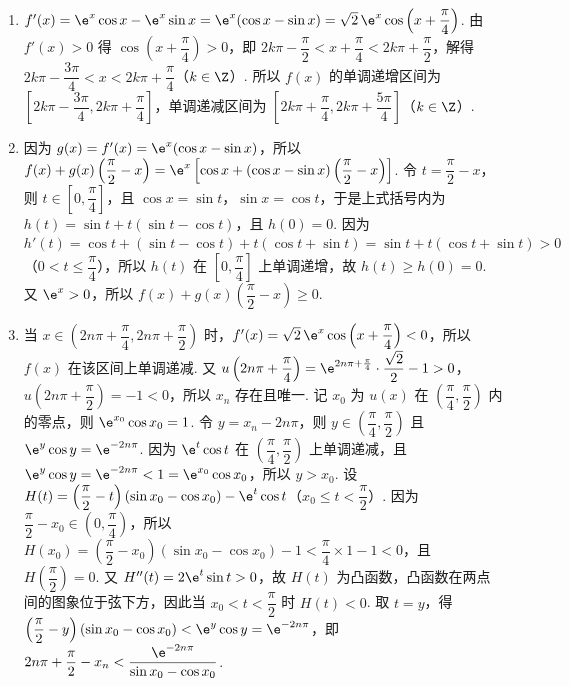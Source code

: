 \begin{solution}
\begin{enumerate}
\item \(f'(x)=\e^x\cos x-\e^x\sin x=\e^x(\cos x-\sin x)=\sqrt2\,\e^x\cos\left(x+\dfrac\pi4\right)\). 由 \(f'(x)>0\) 得 \(\cos\left(x+\dfrac\pi4\right)>0\)，即 \(2k\pi-\dfrac\pi2<x+\dfrac\pi4<2k\pi+\dfrac\pi2\)，解得 \(2k\pi-\dfrac{3\pi}{4}<x<2k\pi+\dfrac\pi4\)（\(k\in\Z\)）. 所以 \(f(x)\) 的单调递增区间为 \(\left[2k\pi-\dfrac{3\pi}{4},2k\pi+\dfrac\pi4\right]\)，单调递减区间为 \(\left[2k\pi+\dfrac\pi4,2k\pi+\dfrac{5\pi}{4}\right]\)（\(k\in\Z\)）.
\item 因为 \(g(x)=f'(x)=\e^x(\cos x-\sin x)\)，所以 \(f(x)+g(x)\left(\dfrac\pi2-x\right)=\e^x\left[\cos x+(\cos x-\sin x)\left(\dfrac\pi2-x\right)\right]\). 令 \(t=\dfrac\pi2-x\)，则 \(t\in\left[0,\dfrac\pi4\right]\)，且 \(\cos x=\sin t\)，\(\sin x=\cos t\)，于是上式括号内为 \(h(t)=\sin t+t(\sin t-\cos t)\)，且 \(h(0)=0\). 因为 \(h'(t)=\cos t+(\sin t-\cos t)+t(\cos t+\sin t)=\sin t+t(\cos t+\sin t)>0\)（\(0<t\le\dfrac\pi4\)），所以 \(h(t)\) 在 \(\left[0,\dfrac\pi4\right]\) 上单调递增，故 \(h(t)\ge h(0)=0\). 又 \(\e^x>0\)，所以 \(f(x)+g(x)\left(\dfrac\pi2-x\right)\ge0\).
\item 当 \(x\in\left(2n\pi+\dfrac\pi4,2n\pi+\dfrac\pi2\right)\) 时，\(f'(x)=\sqrt2\,\e^x\cos\left(x+\dfrac\pi4\right)<0\)，所以 \(f(x)\) 在该区间上单调递减. 又 \(u\left(2n\pi+\dfrac\pi4\right)=\e^{2n\pi+\frac\pi4}\cdot\dfrac{\sqrt2}{2}-1>0\)，\(u\left(2n\pi+\dfrac\pi2\right)=-1<0\)，所以 \(x_n\) 存在且唯一. 记 \(x_0\) 为 \(u(x)\) 在 \(\left(\dfrac\pi4,\dfrac\pi2\right)\) 内的零点，则 \(\e^{x_0}\cos x_0=1\). 令 \(y=x_n-2n\pi\)，则 \(y\in\left(\dfrac\pi4,\dfrac\pi2\right)\) 且 \(\e^y\cos y=\e^{-2n\pi}\). 因为 \(\e^t\cos t\) 在 \(\left(\dfrac\pi4,\dfrac\pi2\right)\) 上单调递减，且 \(\e^y\cos y=\e^{-2n\pi}<1=\e^{x_0}\cos x_0\)，所以 \(y>x_0\). 设 \(H(t)=\left(\dfrac\pi2-t\right)(\sin x_0-\cos x_0)-\e^t\cos t\)（\(x_0\le t<\dfrac\pi2\)）. 因为 \(\dfrac\pi2-x_0\in\left(0,\dfrac\pi4\right)\)，所以 \(H(x_0)=\left(\dfrac\pi2-x_0\right)(\sin x_0-\cos x_0)-1<\dfrac\pi4\times1-1<0\)，且 \(H\left(\dfrac\pi2\right)=0\). 又 \(H''(t)=2\e^t\sin t>0\)，故 \(H(t)\) 为凸函数，凸函数在两点间的图象位于弦下方，因此当 \(x_0<t<\dfrac\pi2\) 时 \(H(t)<0\). 取 \(t=y\)，得 \(\left(\dfrac\pi2-y\right)(\sin x_0-\cos x_0)<\e^y\cos y=\e^{-2n\pi}\)，即 \(2n\pi+\dfrac\pi2-x_n<\dfrac{\e^{-2n\pi}}{\sin x_0-\cos x_0}\).
\end{enumerate}
\end{solution}
